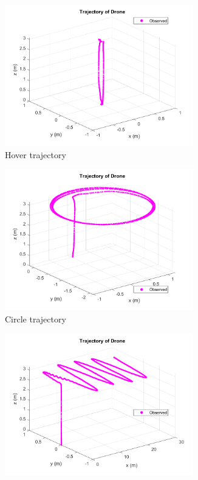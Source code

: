 \documentclass[letterpaper, paper,11pt]{AAS}	%
\begin{document}
\begin{figure}[H]
\centering
\begin{subfigure}{.4\textwidth}
	\centering
	\includegraphics[width=0.9\textwidth]{Figures/hover1_just_traj}
	\caption{Hover trajectory}
	\label{fig:hover1_just_traj}
\end{subfigure}%
\begin{subfigure}{.4\textwidth}
	\centering
	\includegraphics[width=0.9\textwidth]{Figures/circle1_just_traj}
	\caption{Circle trajectory}
	\label{fig:circle1_just_traj}
\end{subfigure}
\begin{subfigure}{.4\textwidth}
	\centering
	\includegraphics[width=0.9\textwidth]{Figures/sine1_just_traj}

\end{subfigure}
\end{figure}
\end{document}
